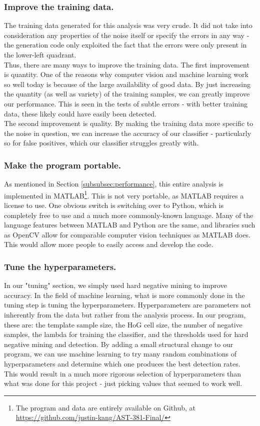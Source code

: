 \documentclass[twocolumn,longauthor]{aastex61}
\begin{document}
\subsubsection{Improve the training data.} \label{subsubsec:training}
\noindent The training data generated for this analysis was very crude. It did not take into consideration any properties of the noise itself or specify the errors in any way - the generation code only exploited the fact that the errors were only present in the lower-left quadrant.\\
\indent Thus, there are many ways to improve the training data. The first improvement is quantity. One of the reasons why computer vision and machine learning work so well today is because of the large availability of good data. By just increasing the quantity (as well as variety) of the training samples, we can greatly improve our performance. This is seen in the tests of subtle errors - with better training data, these likely could have easily been detected.\\
\indent The second improvement is quality. By making the training data more specific to the noise in question, we can increase the accuracy of our classifier - particularly so for false positives, which our classifier struggles greatly with. 

\subsubsection{Make the program portable.} \label{subsubsec:portability}
\noindent As mentioned in Section \ref{subsubsec:performance}, this entire analysis is implemented in MATLAB\footnote{The program and data are entirely available on Github, at \url{https://github.com/justin-kang/AST-381-Final/}}. This is not very portable, as MATLAB requires a license to use. One obvious switch is switching over to Python, which is completely free to use and a much more commonly-known language. Many of the language features between MATLAB and Python are the same, and libraries such as OpenCV allow for comparable computer vision techniques as MATLAB does. This would allow more people to easily access and develop the code.

\subsubsection{Tune the hyperparameters.} \label{subsubsec:hyperparams}
\noindent In our "tuning" section, we simply used hard negative mining to improve accuracy. In the field of machine learning, what is more commonly done in the tuning step is tuning the hyperparameters. Hyperparameters are parameters not inherently from the data but rather from the analysis process. In our program, these are: the template sample size, the HoG cell size, the number of negative samples, the lambda for training the classifier, and the thresholds used for hard negative mining and detection. By adding a small structural change to our program, we can use machine learning to try many random combinations of hyperparameters and determine which one produces the best detection rates. This would result in a much more rigorous selection of hyperparameters than what was done for this project - just picking values that seemed to work well.
\end{document}
